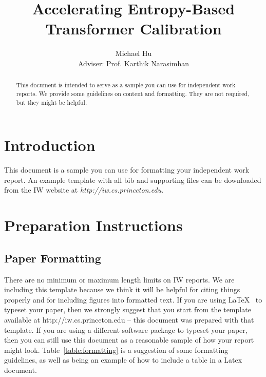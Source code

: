 \documentclass[pageno]{jpaper}
\begin{document}
\title{Accelerating Entropy-Based Transformer Calibration}

\author{Michael Hu \\Adviser: Prof. Karthik Narasimhan}

\date{}
\maketitle

\thispagestyle{empty}
\doublespacing
\begin{abstract}
This document is intended to serve as a sample you can use for independent work reports.  We provide some guidelines on content and formatting.  They are not required, but they might be helpful.
\end{abstract}

\section{Introduction}

This document is a sample you can use for formatting your independent work
report.  An example template with all bib and supporting files can be downloaded
from the IW website at {\em http://iw.cs.princeton.edu}.

\section{Preparation Instructions}

\subsection{Paper Formatting}
\label{section:formatting}

There are no minimum or maximum length limits on IW reports.  
We are including this template because we think it will be helpful
for citing things properly and for including figures into formatted
text.  If you are using \LaTeX~\cite{lamport94} 
to typeset your paper, then we strongly suggest
that you start from the template available at
http://iw.cs.princeton.edu -- this
document was prepared with that template.  
If you are using a different software package to typeset your paper, 
then you can still use this document as a reasonable sample of 
how your report might look.  Table~\ref{table:formatting} is a suggestion
of some formatting guidelines, as well as being an example of how to
include a table in a Latex document.
\end{document}
